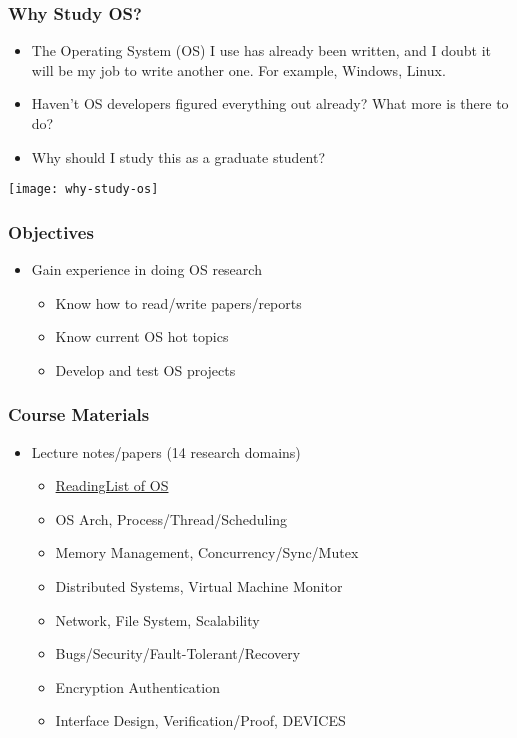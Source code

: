 \begin{frame}

\frametitle{Why Study OS?}

\begin{itemize}
	
	\item The Operating System (OS) I use has already been written, and I doubt it will be my job to write another one. For example, Windows, Linux.
	\item Haven't OS developers figured everything out already? What more is there to do?
	\item Why should I study this as a graduate student?

\end{itemize}
	\centering
	\texttt{[image: why-study-os]}
\end{frame}
\begin{frame}[plain]	
	\frametitle{Objectives}

\begin{itemize}\Large 
	\item Gain experience in doing OS research
	
	\begin{itemize}\large 
		\item Know how to read/write papers/reports
		\item Know current OS hot topics
		\item Develop and test OS projects
	\end{itemize}
\end{itemize}
	
\end{frame}

\begin{frame}[plain]	
	\frametitle{Course Materials}
	
	\begin{itemize}\Large 
		\item Lecture notes/papers (14 research domains)
		
		\begin{itemize}\large 
			\item  \href{https://github.com/chyyuu/aos_course/blob/master/readinglist.md}{ReadingList of OS}
			\item OS Arch,  Process/Thread/Scheduling
			\item Memory Management, Concurrency/Sync/Mutex
			\item Distributed Systems, Virtual Machine Monitor
			\item Network, File System, Scalability
			\item Bugs/Security/Fault-Tolerant/Recovery
			\item Encryption Authentication
			\item Interface Design, Verification/Proof, DEVICES
		\end{itemize}
	\end{itemize}
	
\end{frame}

